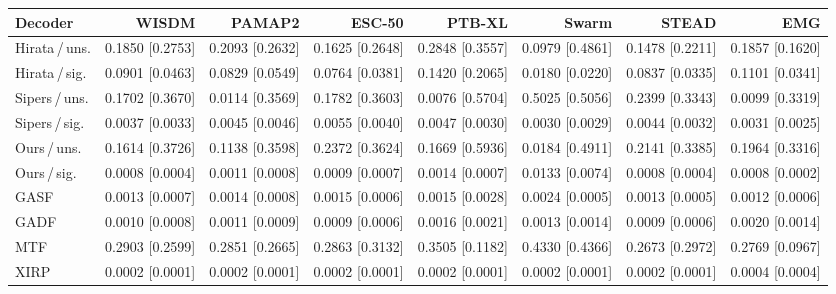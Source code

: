\begin{tabular}{@{}lrrrrrrr@{}}
\toprule
Decoder & WISDM & PAMAP2 & ESC-50 & PTB-XL & Swarm & STEAD & EMG \\
\midrule
Hirata\,/\,uns. & 0.1850 [0.2753] & 0.2093 [0.2632] & 0.1625 [0.2648] & 0.2848 [0.3557] & 0.0979 [0.4861] & 0.1478 [0.2211] & 0.1857 [0.1620] \\
Hirata\,/\,sig. & 0.0901 [0.0463] & 0.0829 [0.0549] & 0.0764 [0.0381] & 0.1420 [0.2065] & 0.0180 [0.0220] & 0.0837 [0.0335] & 0.1101 [0.0341] \\
Sipers\,/\,uns. & 0.1702 [0.3670] & 0.0114 [0.3569] & 0.1782 [0.3603] & 0.0076 [0.5704] & 0.5025 [0.5056] & 0.2399 [0.3343] & 0.0099 [0.3319] \\
Sipers\,/\,sig. & 0.0037 [0.0033] & 0.0045 [0.0046] & 0.0055 [0.0040] & 0.0047 [0.0030] & 0.0030 [0.0029] & 0.0044 [0.0032] & 0.0031 [0.0025] \\
Ours\,/\,uns. & 0.1614 [0.3726] & 0.1138 [0.3598] & 0.2372 [0.3624] & 0.1669 [0.5936] & 0.0184 [0.4911] & 0.2141 [0.3385] & 0.1964 [0.3316] \\
Ours\,/\,sig. & 0.0008 [0.0004] & 0.0011 [0.0008] & 0.0009 [0.0007] & 0.0014 [0.0007] & 0.0133 [0.0074] & 0.0008 [0.0004] & 0.0008 [0.0002] \\
GASF & 0.0013 [0.0007] & 0.0014 [0.0008] & 0.0015 [0.0006] & 0.0015 [0.0028] & 0.0024 [0.0005] & 0.0013 [0.0005] & 0.0012 [0.0006] \\
GADF & 0.0010 [0.0008] & 0.0011 [0.0009] & 0.0009 [0.0006] & 0.0016 [0.0021] & 0.0013 [0.0014] & 0.0009 [0.0006] & 0.0020 [0.0014] \\
MTF & 0.2903 [0.2599] & 0.2851 [0.2665] & 0.2863 [0.3132] & 0.3505 [0.1182] & 0.4330 [0.4366] & 0.2673 [0.2972] & 0.2769 [0.0967] \\
XIRP & 0.0002 [0.0001] & 0.0002 [0.0001] & 0.0002 [0.0001] & 0.0002 [0.0001] & 0.0002 [0.0001] & 0.0002 [0.0001] & 0.0004 [0.0004] \\
\bottomrule
\end{tabular}
